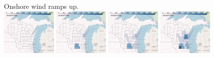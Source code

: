 \documentclass[xcolor=dvipsnames]{beamer}
\begin{document}
\begin{frame}
\item Onshore wind ramps up.\\
  \includegraphics[width=0.2\textwidth]{includes/no_leakage_shutdowns_wind_r0.png}
  \includegraphics[width=0.2\textwidth]{includes/no_leakage_shutdowns_wind_r2.png}
  \includegraphics[width=0.2\textwidth]{includes/no_leakage_shutdowns_wind_r3.png}
  \includegraphics[width=0.2\textwidth]{includes/no_leakage_shutdowns_wind_r4.png}
%
\end{frame}
\end{document}
